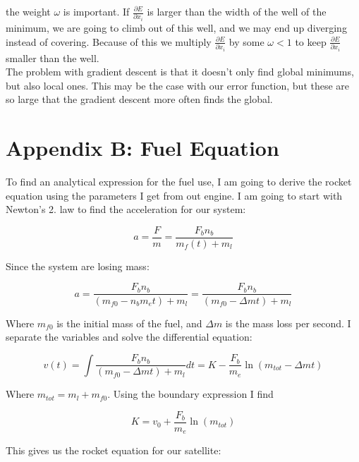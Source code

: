 \documentclass[a4paper, 10pt]{article}
\begin{document}
the weight $\omega$ is important. If $\frac{\partial E}{\partial x_i}$ is larger than the width of the well of the minimum, we are going to climb out of this well, and we may end up diverging instead of  covering. Because of this we multiply $\frac{\partial E}{\partial x_i}$ by some $\omega < 1$ to keep $\frac{\partial E}{\partial x_i}$ smaller than the well.\\

The problem with gradient descent is that it doesn't only find global minimums, but also local ones. This may be the case with our error function, but these are so large that the gradient descent more often finds the global.

\section{Appendix B: Fuel Equation}\label{sec:Fuel}

To find an analytical expression for the fuel use, I am going to derive the rocket equation using the parameters I get from out engine. I am going to start with Newton's 2. law to find the acceleration for our system:

\begin{equation}
a = \frac{F}{m} = \frac{F_b n_b}{m_f(t) + m_l} 
\end{equation}

Since the system are losing mass:

\begin{equation}
a = \frac{F_b n_b}{(m_{f0} - n_b m_e t) + m_l} = \frac{F_b n_b}{(m_{f0} - \Delta m t) + m_l}
\end{equation} 

Where $m_{f0}$ is the initial mass of the fuel, and $\Delta m$ is the mass loss per second. I separate the variables and solve the differential equation:

\begin{equation}
v(t) = \int \frac{F_b n_b}{(m_{f0} - \Delta m t) + m_l} dt
= K - \frac{F_b}{m_e} \ln(m_{tot} - \Delta m t) 
\end{equation}

Where $m_{tot} = m_l + m_{f0}$. Using the boundary expression I find

\begin{equation}
K = v_0 + \frac{F_b}{m_e} \ln (m_{tot})
\end{equation}

This gives us the rocket equation for our satellite: 
\end{document}
